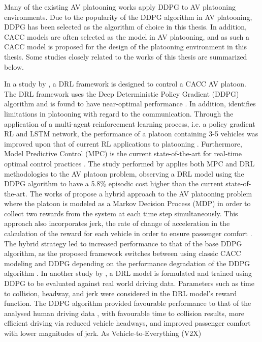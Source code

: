 Many of the existing AV platooning works apply DDPG to AV platooning environments.
Due to the popularity of the DDPG algorithm in AV platooning, DDPG has been selected
as the algorithm of choice in this thesis.
In addition, CACC models are often selected as the model in AV platooning, and as such
a CACC model is proposed for the design of the platooning environment in this thesis.
Some studies closely related to the works of this thesis are summarized below.

In a study
by \cite{Lin2019},  a DRL framework is designed to control a CACC AV platoon.  The
DRL framework uses the Deep Deterministic Policy Gradient (DDPG) \cite{Lillicrap2016}
algorithm and is found to have near-optimal performance \cite{Lin2019}.  In addition,
\cite{Peake2020} identifies limitations in platooning with regard to the communication.
Through the application of a multi-agent reinforcement learning process, i.e. a policy
gradient RL and LSTM network, the performance of a platoon containing 3-5 vehicles was
improved upon that of current RL applications to platooning \cite{Peake2020}. Furthermore,
Model Predictive Control (MPC) is the current state-of-the-art for real-time optimal
control practices \cite{Lin_2021}.  The study performed by \cite{Lin_2021} applies both
MPC and DRL methodologies to the AV platoon problem, observing a DRL model using the
DDPG algorithm to have a 5.8\% episodic cost higher than the current state-of-the-art.
The works of \cite{yan2021hybrid} propose a hybrid approach to the AV platooning
problem where the platoon is modeled as a Markov Decision Process (MDP) in order to
collect two rewards from the system at each time step simultaneously.  This approach
also incorporates jerk, the rate of change of acceleration in the calculation of the
reward for each vehicle in order to ensure passenger comfort \cite{yan2021hybrid}.  The
hybrid strategy led to increased performance to that of the base DDPG algorithm, as the
proposed framework switches between using classic CACC modeling and DDPG depending on
the performance degradation of the DDPG algorithm \cite{yan2021hybrid}. In another
study by \cite{Zhu2019}, a DRL model is formulated and trained using DDPG to be evaluated
against real world driving data. Parameters such as time to collision, headway, and jerk
were considered in the DRL model's reward function.  The DDPG algorithm provided favourable
performance to that of the analysed human driving data \cite{Zhu2019}, with favourable
time to collision results, more efficient driving via reduced vehicle headways, and
improved passenger comfort with lower magnitudes of jerk. As Vehicle-to-Everything (V2X)
